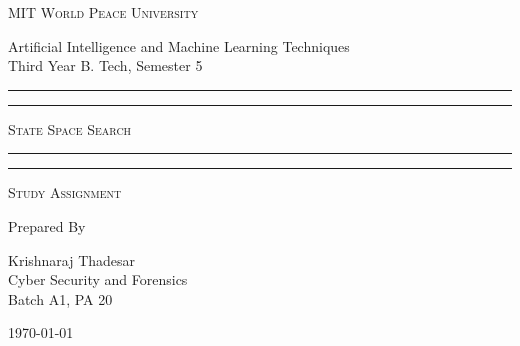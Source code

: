 \documentclass[11pt]{article}
\begin{document}
\begin{titlepage}
    \centering


    \huge\textsc{
        MIT World Peace University
    }\\

    \vspace{0.75\baselineskip} %

    \LARGE{
        Artificial Intelligence and Machine Learning Techniques\\
        Third Year B. Tech, Semester 5
    }

    \vfill %


    \rule{\textwidth}{1.6pt}\vspace*{-\baselineskip}\vspace*{2pt}
    \rule{\textwidth}{0.6pt}
    \vspace{0.75\baselineskip} %



    \huge{\textsc{
            State Space Search
        }} \\



    \vspace{0.5\baselineskip} %
    \rule{\textwidth}{0.6pt}\vspace*{-\baselineskip}\vspace*{2.8pt}
    \rule{\textwidth}{1.6pt}

    \vspace{1\baselineskip} %


    \LARGE\textsc{
        Study Assignment
    } %
    \vfill


    Prepared By
    \vspace{0.5\baselineskip} %

    \Large{
        Krishnaraj Thadesar \\
        Cyber Security and Forensics\\
        Batch A1, PA 20
    }


    \vspace{0.5\baselineskip} %
    \today

\end{titlepage}
\end{document}
